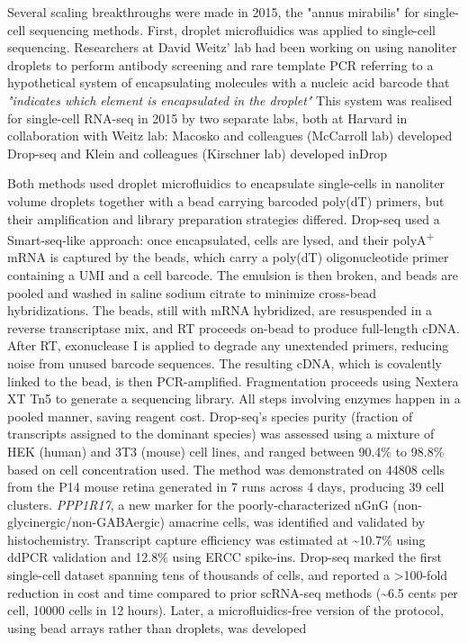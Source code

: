 Several scaling breakthroughs were made in 2015, the "annus mirabilis" for single-cell sequencing methods. First, droplet microfluidics was applied to single-cell sequencing. Researchers at David Weitz' lab had been working on using nanoliter droplets to perform antibody screening and rare template PCR  referring to a hypothetical system of encapsulating molecules with a nucleic acid barcode that \textit{"indicates which element is encapsulated in the droplet"} This system was realised for single-cell RNA-seq in 2015 by two separate labs, both at Harvard in collaboration with Weitz lab: Macosko and colleagues (McCarroll lab) developed Drop-seq and Klein and colleagues (Kirschner lab) developed inDrop

Both methods used droplet microfluidics to encapsulate single-cells in nanoliter volume droplets together with a bead carrying barcoded poly(dT) primers, but their amplification and library preparation strategies differed. Drop-seq used a Smart-seq-like approach: once encapsulated, cells are lysed, and their polyA\textsuperscript{+} mRNA is captured by the beads, which carry a poly(dT) oligonucleotide primer containing a UMI and a cell barcode. The emulsion is then broken, and beads are pooled and washed in saline sodium citrate to minimize cross-bead hybridizations. The beads, still with mRNA hybridized, are resuspended in a reverse transcriptase mix, and RT proceeds on-bead to produce full-length cDNA. After RT, exonuclease I is applied to degrade any unextended primers, reducing noise from unused barcode sequences. The resulting cDNA, which is covalently linked to the bead, is then PCR-amplified. Fragmentation proceeds using Nextera XT Tn5 to generate a sequencing library. All steps involving enzymes happen in a pooled manner, saving reagent cost. Drop-seq's species purity (fraction of transcripts assigned to the dominant species) was assessed using a mixture of HEK (human) and 3T3 (mouse) cell lines, and ranged between 90.4\% to 98.8\% based on cell concentration used. The method was demonstrated on \num{44808} cells from the P14 mouse retina generated in 7 runs across 4 days, producing 39 cell clusters. \textit{PPP1R17}, a new marker for the poorly-characterized nGnG (non-glycinergic/non-GABAergic) amacrine cells, was identified and validated by histochemistry. Transcript capture efficiency was estimated at \textasciitilde10.7\% using ddPCR validation and 12.8\% using ERCC spike-ins. Drop-seq marked the first single-cell dataset spanning tens of thousands of cells, and reported a >100-fold reduction in cost and time compared to prior scRNA-seq methods (\textasciitilde6.5 cents per cell, \num{10000} cells in 12 hours). Later, a microfluidics-free version of the protocol, using bead arrays rather than droplets, was developed

